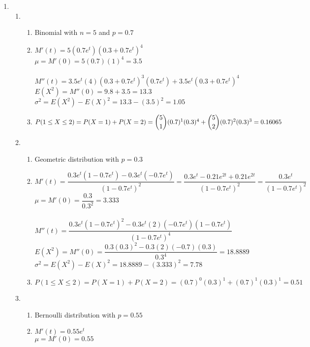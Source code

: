 \documentclass{article}
\begin{document}
\begin{enumerate}
     \item
      \begin{enumerate}
       \item 
	\begin{enumerate}
	 \item Binomial with $n=5$ and $p=0.7$
	 \item 
	  $M'(t) = 5(0.7e^t)(0.3+0.7e^t)^4$ \\
	  $\mu = M'(0) = 5(0.7)(1)^4 = 3.5$ \\
	  \\
	  $M''(t) = 3.5e^t(4)(0.3+0.7e^t)^3(0.7e^t) + 3.5e^t(0.3+0.7e^t)^4$ \\
	  $E(X^2) = M''(0) = 9.8 + 3.5 = 13.3$ \\
	  $\sigma^2 = E(X^2) - E(X)^2 = 13.3 - (3.5)^2 = 1.05$
	 \item
	  $P(1 \le X \le 2) = P(X = 1) + P(X=2) = \dbinom{5}{1}(0.7)^1(0.3)^4 + \dbinom{5}{2}(0.7)^2(0.3)^3
	    = 0.16065$
	\end{enumerate}
       \item
	\begin{enumerate}
	 \item Geometric distribution with $p = 0.3$
	 \item
	  $M'(t) = \dfrac{0.3e^t(1-0.7e^t) - 0.3e^t(-0.7e^t)}{(1-0.7e^t)^2} 
		= \dfrac{0.3e^t-0.21e^{2t} + 0.21e^{2t}}{(1-0.7e^t)^2}
		= \dfrac{0.3e^t}{(1-0.7e^t)^2}$ \\
	  $\mu = M'(0) = \dfrac{0.3}{0.3^2} = 3.333$ \\
	  \\
	  $M''(t) = \dfrac{0.3e^t(1-0.7e^t)^2 - 0.3e^t(2)(-0.7e^t)(1-0.7e^t)}{(1-0.7e^t)^4}$ \\
	  $E(X^2) = M''(0) = \dfrac{0.3(0.3)^2 - 0.3(2)(-0.7)(0.3)}{0.3^4} = 18.8889$ \\
	  $\sigma^2 = E(X^2) - E(X)^2 = 18.8889 - (3.333)^2 = 7.78$
	 \item
	  $P(1 \le X \le 2) = P(X=1) + P(X=2) = (0.7)^0(0.3)^1 + (0.7)^1(0.3)^1 = 0.51$
	\end{enumerate}
       \item
	\begin{enumerate}
	 \item Bernoulli distribution with $p=0.55$
	 \item
	  $M'(t) = 0.55e^t$ \\
	  $\mu = M'(0) = 0.55$ \\
	  \\

\end{enumerate}
\end{enumerate}
\end{enumerate}
\end{document}
